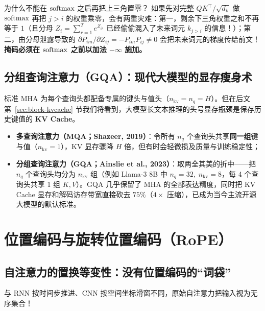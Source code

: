 \begin{insightBox}{为什么不能在 $\operatorname{softmax}$ 之后再把上三角置零？}
如果先对完整 $Q K^\top/\sqrt{d_k}$ 做 $\operatorname{softmax}$ 再把 $j > i$ 的权重乘零，会有两重灾难：第一，剩余下三角权重之和不再等于 $1$（且分母 $Z_i = \sum_{r=1}^T e^{Z_{ir}}$ 已经偷偷混入了未来词元 $k_{j>i}$ 的信息！）；第二，由分母泄露导致的 $\partial P_{im}/\partial Z_{ij} = -P_{im}P_{ij} \ne 0$ 会把未来词元的梯度传给前文！\textbf{掩码必须在 $\operatorname{softmax}$ 之前以加法 $-\infty$ 施加。}
\end{insightBox}

\subsection{分组查询注意力（GQA）：现代大模型的显存瘦身术}

标准 MHA 为每个查询头都配备专属的键头与值头（$n_{\text{kv}} = n_q = H$）。但在后文第~\ref{sec:block-kvcache} 节我们将看到，大模型长文本推理的头号显存瓶颈是保存历史键值的 \textbf{KV Cache}。
\begin{itemize}
  \item \textbf{多查询注意力（MQA；Shazeer, 2019）}：令所有 $n_q$ 个查询头共享\textbf{同一组}键与值（$n_{\text{kv}} = 1$），KV 显存骤降 $H$ 倍，但有时会轻微损及质量与训练稳定性；
  \item \textbf{分组查询注意力（GQA；Ainslie et al., 2023）}：取两全其美的折中——把 $n_q$ 个查询头均分为 $n_{\text{kv}}$ 组（例如 Llama-3 8B 中 $n_q = 32,\; n_{\text{kv}} = 8$，每 4 个查询头共享 1 组 $K, V$）。GQA 几乎保留了 MHA 的全部表达精度，同时把 KV Cache 显存和解码访存带宽直接砍去 $75\%$（$4\times$ 压缩），已成为当今主流开源大模型的默认标准。
\end{itemize}

\section{位置编码与旋转位置编码（RoPE）}
\label{sec:pe-rope}

\subsection{自注意力的置换等变性：没有位置编码的“词袋”}

与 RNN 按时间步推进、CNN 按空间坐标滑窗不同，原始自注意力把输入视为无序集合！

